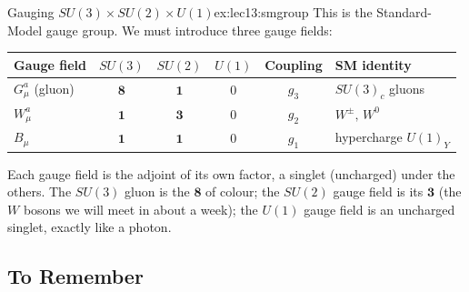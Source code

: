 \documentclass[../main.tex]{subfiles}
\begin{document}
\begin{Example}{Gauging $SU(3)\times SU(2)\times U(1)$}{ex:lec13:smgroup}
This is the Standard-Model gauge group. We must introduce three gauge fields:
\begin{center}
\renewcommand{\arraystretch}{1.3}
\begin{tabular}{lccccl}
  \toprule
  Gauge field & $SU(3)$ & $SU(2)$ & $U(1)$ & Coupling & SM identity \\
  \midrule
  $G_\mu^a$ (gluon) & $\mathbf{8}$ & $\mathbf{1}$ & $0$ & $g_3$ & $SU(3)_c$ gluons \\
  $W_\mu^a$        & $\mathbf{1}$ & $\mathbf{3}$ & $0$ & $g_2$ & $W^\pm,\,W^0$ \\
  $B_\mu$          & $\mathbf{1}$ & $\mathbf{1}$ & $0$ & $g_1$ & hypercharge $U(1)_Y$ \\
  \bottomrule
\end{tabular}
\end{center}
Each gauge field is the adjoint of its own factor, a singlet (uncharged) under the others. The $SU(3)$ gluon is the $\mathbf{8}$ of colour; the $SU(2)$ gauge field is its $\mathbf{3}$ (the $W$ bosons we will meet in about a week); the $U(1)$ gauge field is an uncharged singlet, exactly like a photon.
\end{Example}

\subsection*{To Remember}
\end{document}
